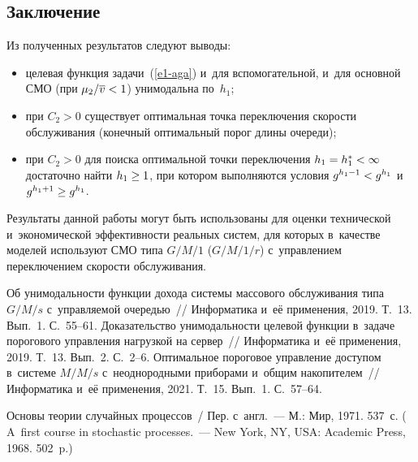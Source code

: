 \begin{multicols}{2}
  
\section{Заключение}

  Из полученных результатов следуют выводы:
  \begin{itemize}
\item целевая функция задачи~(\ref{e1-aga}) и~для вспомогательной, и~для 
основ\-ной СМО (при $\mu_2/\overline{v}\hm<1$) унимодальна по~$h_1$;
\item при $C_2>0$ существует оптимальная точ\-ка переключения ско\-рости 
обслуживания (конечный оптимальный порог длины очереди);
\item при $C_2>0$ для поиска оптимальной точ\-ки переключения $h_1\hm= 
h_1^*\hm<\infty$ достаточно \mbox{найти} $h_1\hm\geq1$, при котором 
выполняются условия $g^{h_1-1}\hm< g^{h_1}$ и~$g^{h_1+1}\hm\geq 
g^{h_1}$.
\end{itemize}

  Результаты данной работы могут быть использованы для оценки технической 
  и~экономической эф\-фек\-тив\-ности реальных сис\-тем, для которых в~качестве 
моделей используют СМО типа $G/M/1$ ($G/M/1/r$) с~управ\-ле\-ни\-ем 
переключением ско\-рости обслуживания. 

{\small\frenchspacing
 {%
 \begin{thebibliography}{9}
 Об унимодальности функции дохода сис\-те\-мы массового 
обслуживания типа $G/M/s$ с~управ\-ля\-емой оче\-редью~// Информатика и~её применения, 
2019. Т.~13. Вып.~1. С.~55--61.
 Доказательство уни\-мо\-даль\-ности целевой функции 
в~задаче порогового управ\-ле\-ния нагрузкой на сервер~// Информатика и~её применения, 2019. 
Т.~13. Вып.~2. С.~2--6.
 Оптимальное пороговое управ\-ле\-ние доступом в~сис\-те\-ме $M/M/s$ 
с~неоднородными приборами и~общим накопителем~// Информатика и~её применения, 2021. 
Т.~15. Вып.~1. С.~57--64.

 Основы тео\-рии случайных процессов~/ Пер. с~англ.~--- М.: Мир, 1971. 537~с. 
( A~first course in stochastic processes.~--- New York, NY, USA: Academic Press, 
1968. 502~p.)


\end{thebibliography}}}
\end{multicols}
